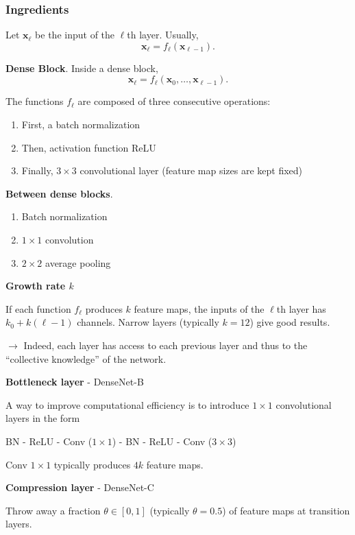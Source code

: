 \begin{frame}[allowframebreaks]
	\frametitle{Ingredients}
	
	
	
	Let $\textbf{x}_{\ell}$ be the input of the $\ell$th layer. Usually, 
	$$
	\textbf{x}_{\ell} = f_{\ell}(\textbf{x}_{\ell-1}).
	$$

\bigskip 

\textbf{Dense Block}. Inside a dense block,
	$$
	\textbf{x}_{\ell} = f_{\ell}(\textbf{x}_{0}, \hdots, \textbf{x}_{\ell-1}).
	$$
	
	The functions $f_{\ell}$ are composed of three consecutive operations: 
	\begin{enumerate}
		\item First, a batch normalization
		\item Then, activation function ReLU
		\item Finally, $3 \times 3$ convolutional layer (feature map sizes are kept fixed)
	\end{enumerate}

\bigskip 

\textbf{Between dense blocks}.
	\begin{enumerate}
		\item Batch normalization
		\item $1 \times 1$ convolution
		\item $2 \times 2$ average pooling
	\end{enumerate}

\framebreak 

\textbf{Growth rate $k$}

If each function $f_{\ell}$ produces $k$ feature maps, the inputs of the $\ell$th layer has $k_0 + k(\ell-1)$ channels. Narrow layers (typically $k=12$) give good results. 

$\rightarrow$ Indeed, each layer has access to each previous layer and thus to the ``collective knowledge'' of the network. 

\bigskip 

\textbf{Bottleneck layer} - DenseNet-B 

A way to improve computational efficiency is to introduce $1 \times 1$ convolutional layers in the form 
\begin{center}
	BN - ReLU - Conv ($1 \times 1$) - BN - ReLU - Conv ($3 \times 3$)
\end{center}
Conv  $1 \times 1$ typically produces $4k$ feature maps. 

\bigskip 

\textbf{Compression layer} - DenseNet-C

Throw away a fraction $\theta \in [0,1]$ (typically $\theta=0.5$) of feature maps at transition layers.
\end{frame}










